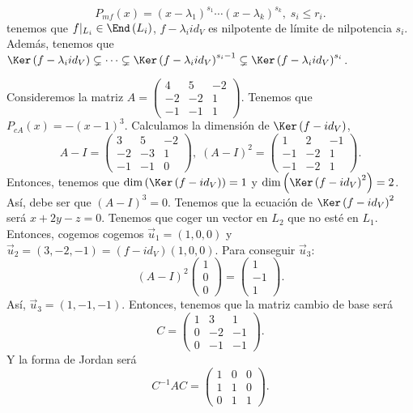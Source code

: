 \[P_{mf}\left(x\right) = \left(x - \lambda_{1}\right)^{s_{1}} \cdots \left(x - \lambda_{k}\right)^{s_{k}}, \; s_{i} \leq r_{i} .\]
tenemos que $\displaystyle f|_{L_{i}} \in \End\left(L_{i}\right) $, $\displaystyle f -\lambda_{i}id _{V} $ es nilpotente de límite de nilpotencia $\displaystyle s_{i} $. Además, tenemos que $\displaystyle \Ker\left(f - \lambda_{i} id _{V}\right) \subsetneq \cdots \subsetneq \Ker\left(f - \lambda_{i} id _{V}\right)^{s _{i}-1} \subsetneq \Ker\left(f - \lambda_{i}id _{V}\right)^{s_{i}} $.
\begin{eg}
	\normalfont Consideremos la matriz $\displaystyle A = \begin{pmatrix} 4 & 5 & - 2 \\ - 2 & - 2 & 1 \\ - 1 & - 1 & 1 \end{pmatrix} $. Tenemos que $\displaystyle P_{cA}\left(x\right) = - \left(x-1\right)^{3} $. Calculamos la dimensión de $\displaystyle \Ker\left(f - id _{V}\right) $,
	\[A - I = \begin{pmatrix} 3 & 5 & -2 \\ -2 & - 3 & 1 \\ - 1 & - 1 & 0 \end{pmatrix}, \; \left(A - I\right)^{2} = \begin{pmatrix} 1 & 2 & -1 \\ -1 & -2 & 1 \\ - 1 & - 2 & 1 \end{pmatrix} .\]
Entonces, tenemos que $\displaystyle \dim\left(\Ker\left(f - id _{V}\right)\right) = 1 $ y $\displaystyle \dim\left(\Ker\left(f - id _{V}\right)^{2}\right) = 2 $. Así, debe ser que $\displaystyle \left(A - I\right)^{3} = 0 $. Tenemos que la ecuación de $\displaystyle \Ker\left(f - id _{V}\right)^{2} $ será $\displaystyle x +2y - z = 0 $. Tenemos que coger un vector en $\displaystyle L_{2} $ que no esté en $\displaystyle L_{1} $. Entonces, cogemos cogemos $\displaystyle \vec{u}_{1} = \left(1,0,0\right) $ y $\displaystyle \vec{u}_{2} = \left(3, -2, -1\right) = \left(f - id _{V}\right)\left(1,0,0\right) $. 
Para conseguir $\displaystyle \vec{u}_{3} $:
	\[ \left(A - I\right)^{2} \begin{pmatrix} 1 \\ 0 \\ 0 \end{pmatrix} = \begin{pmatrix} 1 \\ - 1 \\ 1 \end{pmatrix} .\]
Así, $\displaystyle \vec{u}_{3} = \left(1, - 1, - 1\right) $. Entonces, tenemos que la matriz cambio de base será
	\[ C = \begin{pmatrix} 1 & 3 & 1 \\ 0 & - 2& - 1 \\ 0 & - 1 & -1 \end{pmatrix} .\]
Y la forma de Jordan será
	\[ C^{-1}AC = \begin{pmatrix} 1 & 0 & 0 \\ 1 & 1 & 0 \\ 0 & 1 & 1 \end{pmatrix} .\]
\end{eg}
